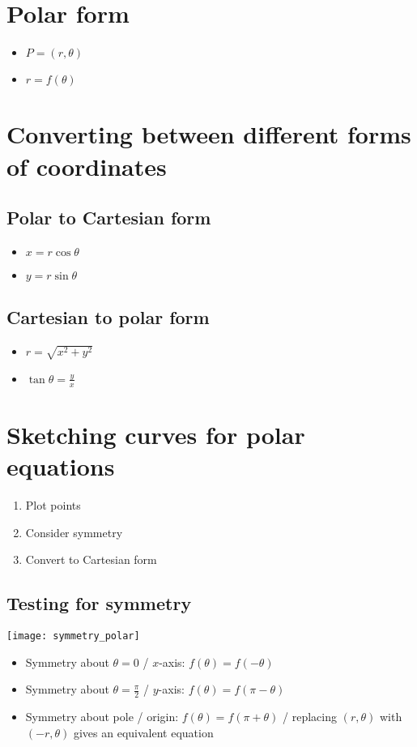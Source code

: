 \section{Polar form}
\begin{itemize}
    \item $P=(r,\theta)$
    \item $r=f(\theta)$
\end{itemize}

\section{Converting between different forms of coordinates}
\subsection{Polar to Cartesian form}
\begin{itemize}
    \item $x=r\cos\theta$
    \item $y=r\sin\theta$
\end{itemize}
\subsection{Cartesian to polar form}
\begin{itemize}
    \item $r=\sqrt{x^2+y^2}$
    \item $\tan\theta=\frac{y}{x}$
\end{itemize}


\section{Sketching curves for polar equations}
\begin{enumerate}
    \item Plot points
    \item Consider symmetry
    \item Convert to Cartesian form
\end{enumerate}

\subsection{Testing for symmetry}
\texttt{[image: symmetry\_polar]}
\begin{itemize}
    \item Symmetry about $\theta=0$ / $x$-axis: $f(\theta)=f(-\theta)$
    \item Symmetry about $\theta=\frac{\pi}{2}$ / $y$-axis: $f(\theta)=f(\pi-\theta)$
    \item Symmetry about pole / origin: $f(\theta)=f(\pi+\theta)$ / replacing $(r,\theta)$ with $(-r,
              \theta)$ gives an equivalent equation
\end{itemize}


